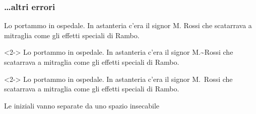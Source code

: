\documentclass[svgnames,%
	ucs,%
	pdftex]{guitbeamer}
\begin{document}
\begin{frame}
  \frametitle{\dots altri errori}
	\begin{LaTeXoutput}
		Lo portammo in ospedale. In astanteria c'era il signor M. 
		Rossi che scatarrava a mitraglia come gli effetti speciali di Rambo.
	\end{LaTeXoutput}
	\begin{LaTeXcode}<2->
		Lo portammo in ospedale. In astanteria c'era il signor M.\alert{\textasciitilde}Rossi che scatarrava a mitraglia come gli effetti speciali di Rambo.
	\end{LaTeXcode}
	\begin{LaTeXoutput}<2->
		Lo portammo in ospedale. In astanteria c'era il signor M.~Rossi che scatarrava a mitraglia come gli effetti speciali di Rambo.
	\end{LaTeXoutput}
  \smallskip
	Le iniziali vanno separate da uno spazio insecabile
\end{frame}
\end{document}
